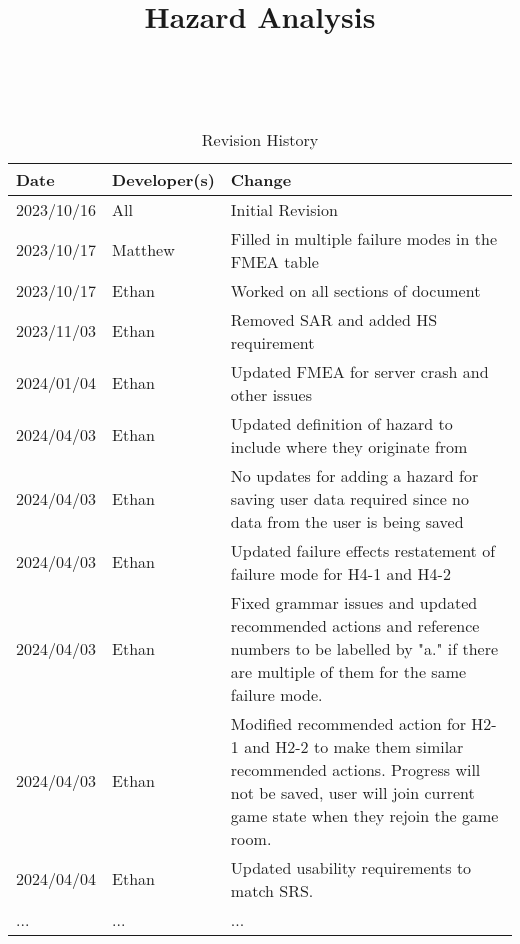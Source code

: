\documentclass{article}
\title{Hazard Analysis\\\progname}
\author{\authname}
\date{}
\begin{document}
\maketitle
\thispagestyle{empty}

~\newpage


\begin{table}[hp]
\caption{Revision History} \label{TblRevisionHistory}
\begin{tabularx}{\textwidth}{llX}
\toprule
\textbf{Date} & \textbf{Developer(s)} & \textbf{Change}\\
\midrule
2023/10/16 & All & Initial Revision\\
2023/10/17 & Matthew & Filled in multiple failure modes in the FMEA table \\
2023/10/17 & Ethan & Worked on all sections of document \\
2023/11/03 & Ethan & Removed SAR and added HS requirement \\
2024/01/04 & Ethan & Updated FMEA for server crash and other issues\\
2024/04/03 & Ethan & Updated definition of hazard to include where they originate from\\
2024/04/03 & Ethan & No updates for adding a hazard for saving user data required since no data from the user is being saved\\
2024/04/03 & Ethan & Updated failure effects restatement of failure mode for H4-1 and H4-2\\
2024/04/03 & Ethan & Fixed grammar issues and updated recommended actions and reference numbers to be labelled by "a." if there are multiple of them for the same failure mode.\\
2024/04/03 & Ethan & Modified recommended action for H2-1 and H2-2 to make them similar recommended actions. Progress will not be saved, user will join current game state when they rejoin the game room. \\
2024/04/04 & Ethan & Updated usability requirements to match SRS. \\
... & ... & ...\\
\bottomrule
\end{tabularx}
\end{table}

~\newpage

\tableofcontents

~\newpage


\end{document}
